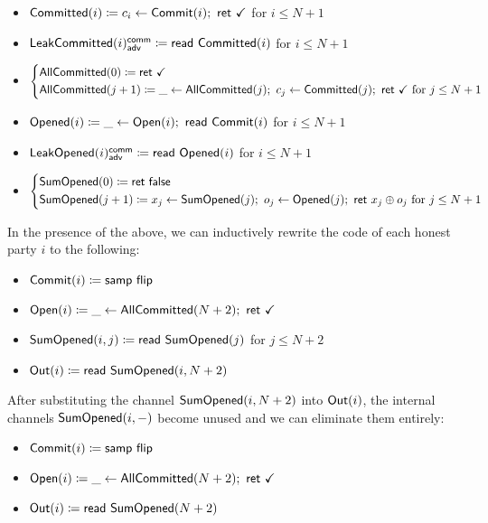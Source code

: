 \begin{itemize}
\item {\color{magenta} $\mathsf{Committed}(i) \coloneqq c_i \leftarrow \mathsf{Commit}(i); \ \mathsf{ret} \ \checkmark$ for $i \leq N+1$}
\item {\color{magenta} $\mathsf{LeakCommitted}(i)^{\mathsf{comm}}_{\mathsf{adv}} \coloneqq \mathsf{read} \ \mathsf{Committed}(i)$ for $i \leq N+1$}
\item {\color{magenta} $\begin{cases*} \AllCommitted(0) \coloneqq \ret{\checkmark} \\ \AllCommitted(j+1) \coloneqq \_ \leftarrow \AllCommitted(j); \ c_j \leftarrow \Committed(j); \ \ret{\checkmark} \text{ for $j \leq N+1$} \end{cases*}$}
\item {\color{red} $\mathsf{Opened}(i) \coloneqq \_ \leftarrow \mathsf{Open}(i); \ \mathsf{read} \ \mathsf{Commit}(i)$ for $i \leq N+1$}
\item {\color{red} $\mathsf{LeakOpened}(i)^{\mathsf{comm}}_{\mathsf{adv}} \coloneqq \mathsf{read} \ \mathsf{Opened}(i)$ for $i \leq N+1$}
\item {\color{red} $\begin{cases*} \SumOpened(0) \coloneqq \ret{\false} \\ \SumOpened(j+1) \coloneqq x_j \leftarrow \SumOpened(j); \ o_j \leftarrow \Opened(j); \ \ret{x_j \oplus o_j} \text{ for $j \leq N+1$} \end{cases*}$}
\end{itemize}

\noindent In the presence of the above, we can inductively rewrite the code of each honest party $i$ to the following:

\begin{itemize}
\item {\color{blue} $\mathsf{Commit}(i) \coloneqq \mathsf{samp} \ \mathsf{flip}$}
\item {\color{teal} $\Open(i) \coloneqq \_ \leftarrow \AllCommitted(N+2); \ \ret{\checkmark}$}
\item {\color{red} $\mathsf{SumOpened}(i,j) \coloneqq \mathsf{read} \ \mathsf{SumOpened}(j)$ for $j \leq N+2$}
\item $\mathsf{Out}(i) \coloneqq \mathsf{read} \ \mathsf{SumOpened}(i,N+2)$
\end{itemize}

\noindent After substituting the channel $\mathsf{SumOpened}(i,N+2)$ into $\mathsf{Out}(i)$, the internal channels $\mathsf{SumOpened}(i,-)$ become unused and we can eliminate them entirely:

\begin{itemize}
\item {\color{blue} $\mathsf{Commit}(i) \coloneqq \mathsf{samp} \ \mathsf{flip}$}
\item {\color{teal} $\Open(i) \coloneqq \_ \leftarrow \AllCommitted(N+2); \ \ret{\checkmark}$}
\item $\mathsf{Out}(i) \coloneqq \mathsf{read} \ \mathsf{SumOpened}(N+2)$
\end{itemize}

